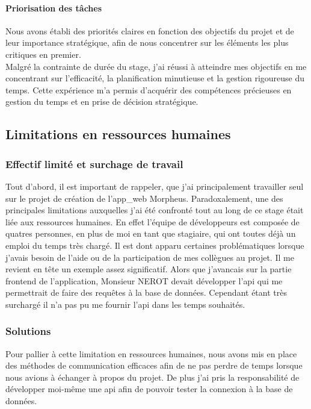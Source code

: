 \documentclass[a4paper, 12pt, french]{article}
\begin{document}
							\paragraph{Priorisation des tâches\\}
								Nous avons établi des priorités claires en fonction des objectifs du projet et de leur importance stratégique, afin de nous concentrer sur les éléments les plus critiques en premier.\\

				\vspace{\baselineskip}
				Malgré la contrainte de durée du stage, j'ai réussi à atteindre mes objectifs en me concentrant sur l'efficacité, la planification minutieuse et la gestion rigoureuse du temps. Cette expérience m'a permis d'acquérir des compétences précieuses en gestion du temps et en prise de décision stratégique.
				\newpage
					\subsection{Limitations en ressources humaines}
						\subsubsection{Effectif limité et surchage de travail}
							Tout d'abord, il est important de rappeler, que j'ai principalement travailler seul sur le projet de création de l'\gls{app_web} Morpheus. Paradoxalement, une des principales limitations auxquelles j'ai été confronté tout au long de ce stage était liée aux ressources humaines. En effet l'équipe de développeurs est composée de quatres personnes, en plus de moi en tant que stagiaire, qui ont toutes déjà un emploi du temps très chargé. Il est dont apparu certaines problématiques lorsque j'avais besoin de l'aide ou de la participation de mes collègues au projet. Il me revient en tête un exemple assez significatif. Alors que j'avancais sur la partie \gls{frontend} de l'application, Monsieur NEROT devait développer l'\acrshort{api} qui me permettrait de faire des requêtes à la base de données. Cependant étant très surchargé il n'a pas pu me fournir l'\acrshort{api} dans les temps souhaités.
						
						\subsubsection{Solutions}
								Pour pallier à cette limitation en ressources humaines, nous avons mis en place des méthodes de communication efficaces afin de ne pas perdre de temps lorsque nous avions à échanger à propos du projet. De plus j'ai pris la responsabilité de développer moi-même une \acrshort{api} afin de pouvoir tester la connexion à la base de données.
\end{document}
